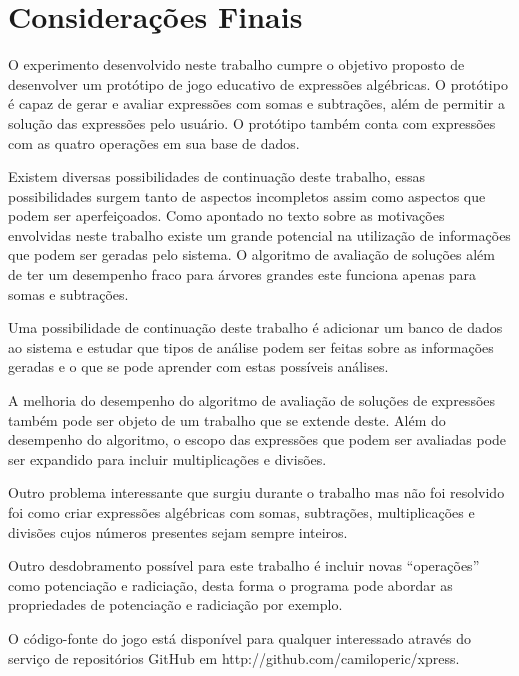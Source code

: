 \part{Considerações Finais}
O experimento desenvolvido neste trabalho cumpre o objetivo proposto de desenvolver um protótipo de jogo educativo de expressões algébricas. O protótipo é capaz de gerar e avaliar expressões com somas e subtrações, além de permitir a solução das expressões pelo usuário. O protótipo também conta com expressões com as quatro operações em sua base de dados.

Existem diversas possibilidades de continuação deste trabalho, essas possibilidades surgem tanto de aspectos incompletos assim como aspectos que podem ser aperfeiçoados. Como apontado no texto sobre as motivações envolvidas neste trabalho existe um grande potencial na utilização de informações que podem ser geradas pelo sistema. O algoritmo de avaliação de soluções além de ter um desempenho fraco para árvores grandes este funciona apenas para somas e subtrações.

Uma possibilidade de continuação deste trabalho é adicionar um banco de dados ao sistema e estudar que tipos de análise podem ser feitas sobre as informações geradas e o que se pode aprender com estas possíveis análises.

A melhoria do desempenho do algoritmo de avaliação de soluções de expressões também pode ser objeto de um trabalho que se extende deste. Além do desempenho do algoritmo, o escopo das expressões que podem ser avaliadas pode ser expandido para incluir multiplicações e divisões.

Outro problema interessante que surgiu durante o trabalho mas não foi resolvido foi como criar expressões algébricas com somas, subtrações, multiplicações e divisões cujos números presentes sejam sempre inteiros.

Outro desdobramento possível para este trabalho é incluir novas “operações” como potenciação e radiciação, desta forma o programa pode abordar as propriedades de potenciação e radiciação por exemplo.

O código-fonte do jogo está disponível para qualquer interessado através do serviço de repositórios GitHub em http://github.com/camiloperic/xpress.

